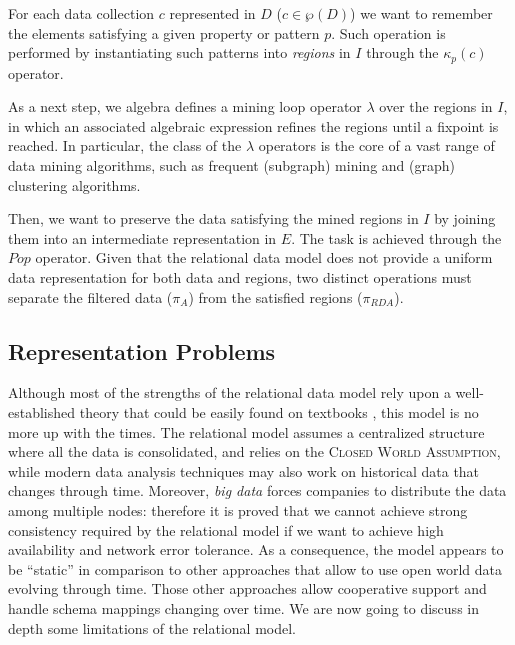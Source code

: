For each data collection $c$ represented in $D$ ($c\in \wp(D)$) we want to remember the elements satisfying a given property or pattern $p$. Such operation is performed by instantiating such patterns into \textit{regions} in $I$ through the $\kappa_p(c)$ operator.

As a next step, we algebra defines a mining loop operator $\lambda$\index{$\lambda$} over the regions in $I$, in which an associated algebraic expression refines the regions until a fixpoint is reached. In particular, the class of the $\lambda$ operators is the core of a vast range of data mining algorithms, such as frequent (subgraph) mining \cite{JunghannsKAPR17} and (graph) clustering \cite{vanDongen2012} algorithms.  

Then, we want to preserve the data satisfying the mined regions in $I$ by joining them into an intermediate representation in $E$. The task is achieved through the $Pop$ operator. Given that the relational data model does not provide a uniform data representation for both data and regions, two distinct operations must separate the filtered data ($\pi_A$) from the satisfied regions ($\pi_{RDA}$).

\subsection{Representation Problems}\label{sec:relreprprob}
Although most of the strengths of the relational data model rely upon a well-established theory \cite{Codd} that could be easily found on textbooks \cite{Garcia-Molina}, this model is no more up with the times. The relational model assumes a centralized structure where all the data is consolidated, and relies on the \textsc{Closed World Assumption}, while modern data analysis techniques may also work on historical data that changes through time. Moreover, \textit{big data} forces companies to distribute the data among multiple nodes: therefore it is proved \cite{Gilbert02} that we cannot achieve strong consistency required by the relational model if we want to achieve high availability and network error tolerance. As a consequence, the model appears to be ``static'' \cite{Badia} in comparison to other approaches that allow to use open world data evolving through time. Those other approaches allow cooperative support \cite{Aligon201520} and  handle schema mappings changing over time.  We are now going to discuss in depth some limitations of the relational model.


